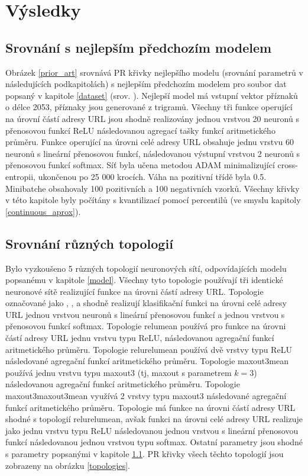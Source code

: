 \chapter{Výsledky}

\section{Srovnání s nejlepším předchozím modelem}\label{prior_art_comparison}
Obrázek \ref{prior_art} srovnává PR křivky nejlepšího modelu (srovnání parametrů v následujících podkapitolách) s nejlepším předchozím modelem pro soubor dat popsaný v kapitole \ref{dataset} (srov. \cite{machlica_learning_2017}). Nejlepší model má vstupní vektor příznaků o délce 2053, příznaky jsou generované z trigramů. Všechny tři funkce operující na úrovní částí adresy URL jsou shodně realizovány jednou vrstvou 20 neuronů s přenosovou funkcí ReLU následovanou agregací tašky funkcí aritmetického průměru. Funkce operující na úrovni celé adresy URL obsahuje jednu vrstvu 60 neuronů s lineární přenosovou funkcí, následovanou výstupní vrstvou 2 neuronů s přenosovou funkcí softmax. Síť byla učena metodou ADAM minimalizující cross-entropii, ukončenou po 25 000 krocích. Váha na pozitivní třídě byla 0.5. Minibatche obsahovaly 100 pozitivních a 100 negativních vzorků.  Všechny křivky v této kapitole byly počítány s kvantilizací pomocí percentilů (ve smyslu kapitoly \ref{continuous_aprox}).


\section{Srovnání různých topologií}

Bylo vyzkoušeno 5 různých topologií neuronových sítí, odpovídajících modelu popsanému v kapitole \ref{model}. Všechny tyto topologie používají tři identické neuronové sítě realizující funkce na úrovni částí adresy URL. Topologie označované jako , ,  a  shodně realizují klasifikační funkci na úrovni celé adresy URL jednou vrstvou neuronů s lineární přenosovou funkcí a jednou vrstvou s přenosovou funkcí softmax. Topologie relumean používá pro funkce na úrovni částí adresy URL jednu vrstvu typu ReLU, následovanou agregační funkcí aritmetického průměru. Topologie relurelumean používá dvě vrstvy typu ReLU následované agregační funkcí aritmetického průměru. Topologie maxout3mean používá jednu vrstvu typu maxout3 (tj, maxout s parametrem \( k = 3 \)) následovanou agregační funkcí aritmetického průměru. Topologie maxout3maxout3mean využívá 2 vrstvy typu maxout3 následované agregační funkcí aritmetického průměru. Topologie  má funkce na úrovni částí adresy URL shodné s topologií relurelumean, avšak funkci na úrovni celé adresy URL realizuje jako jednu vrstvu typu ReLU následovanou jednou vrstvou s lineární přenosovou funkcí následovanou jednou vrstvou typu softmax. Ostatní parametry jsou shodné s parametry popsanými v kapitole \ref{prior_art_comparison}. PR křivky všech těchto topologií jsou zobrazeny na obrázku \ref{topologies}.

